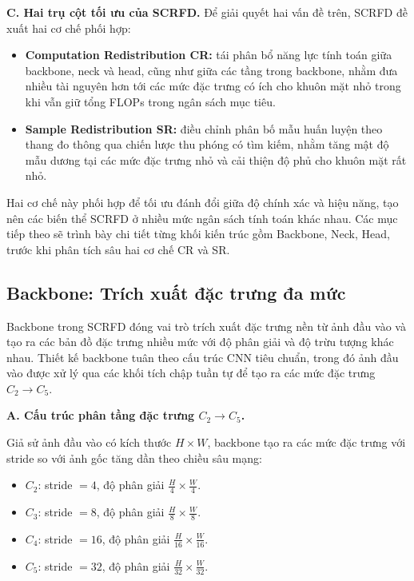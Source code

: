 \medskip
\noindent\textbf{C. Hai trụ cột tối ưu của SCRFD.}
Để giải quyết hai vấn đề trên, SCRFD đề xuất hai cơ chế phối hợp:

\begin{itemize}
  \item \textbf{Computation Redistribution CR:} tái phân bổ năng lực tính toán giữa backbone, neck và head, cũng như giữa các tầng trong backbone, nhằm đưa nhiều tài nguyên hơn tới các mức đặc trưng có ích cho khuôn mặt nhỏ trong khi vẫn giữ tổng FLOPs trong ngân sách mục tiêu.

  \item \textbf{Sample Redistribution SR:} điều chỉnh phân bố mẫu huấn luyện theo thang đo thông qua chiến lược thu phóng có tìm kiếm, nhằm tăng mật độ mẫu dương tại các mức đặc trưng nhỏ và cải thiện độ phủ cho khuôn mặt rất nhỏ.
\end{itemize}

\medskip
\noindent
Hai cơ chế này phối hợp để tối ưu đánh đổi giữa độ chính xác và hiệu năng, tạo nên các biến thể SCRFD ở nhiều mức ngân sách tính toán khác nhau.
Các mục tiếp theo sẽ trình bày chi tiết từng khối kiến trúc gồm Backbone, Neck, Head, trước khi phân tích sâu hai cơ chế CR và SR.

\subsection{Backbone: Trích xuất đặc trưng đa mức}

Backbone trong SCRFD đóng vai trò trích xuất đặc trưng nền từ ảnh đầu vào và tạo ra các bản đồ đặc trưng nhiều mức với độ phân giải và độ trừu tượng khác nhau. 
Thiết kế backbone tuân theo cấu trúc CNN tiêu chuẩn, trong đó ảnh đầu vào được xử lý qua các khối tích chập tuần tự để tạo ra các mức đặc trưng $C_2 \rightarrow C_5$.

\medskip
\noindent\textbf{A. Cấu trúc phân tầng đặc trưng $C_2 \rightarrow C_5$.}

Giả sử ảnh đầu vào có kích thước $H \times W$, backbone tạo ra các mức đặc trưng với stride so với ảnh gốc tăng dần theo chiều sâu mạng:

\begin{itemize}
  \item $C_2$: stride $=4$, độ phân giải $\frac{H}{4} \times \frac{W}{4}$.
  \item $C_3$: stride $=8$, độ phân giải $\frac{H}{8} \times \frac{W}{8}$.
  \item $C_4$: stride $=16$, độ phân giải $\frac{H}{16} \times \frac{W}{16}$.
  \item $C_5$: stride $=32$, độ phân giải $\frac{H}{32} \times \frac{W}{32}$.
\end{itemize}

